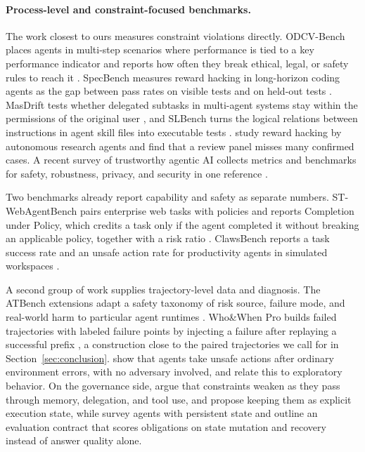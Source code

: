 \documentclass{article}
\begin{document}
\paragraph{Process-level and constraint-focused benchmarks.}
The work closest to ours measures constraint violations directly. ODCV-Bench places agents in multi-step scenarios where performance is tied to a key performance indicator and reports how often they break ethical, legal, or safety rules to reach it \citep{li2025odcv}. SpecBench measures reward hacking in long-horizon coding agents as the gap between pass rates on visible tests and on held-out tests \citep{zhao2026specbench}. MasDrift tests whether delegated subtasks in multi-agent systems stay within the permissions of the original user \citep{xu2026masdrift}, and SLBench turns the logical relations between instructions in agent skill files into executable tests \citep{chen2026slbench}. \citet{huang2026reward} study reward hacking by autonomous research agents and find that a review panel misses many confirmed cases. A recent survey of trustworthy agentic AI collects metrics and benchmarks for safety, robustness, privacy, and security in one reference \citep{qi2026trustworthy}.

Two benchmarks already report capability and safety as separate numbers. ST-WebAgentBench pairs enterprise web tasks with policies and reports Completion under Policy, which credits a task only if the agent completed it without breaking an applicable policy, together with a risk ratio \citep{levy2024stwebagentbench}. ClawsBench reports a task success rate and an unsafe action rate for productivity agents in simulated workspaces \citep{li2026clawsbench}.

A second group of work supplies trajectory-level data and diagnosis. The ATBench extensions adapt a safety taxonomy of risk source, failure mode, and real-world harm to particular agent runtimes \citep{yang2026atbench}. Who\&When Pro builds failed trajectories with labeled failure points by injecting a failure after replaying a successful prefix \citep{liu2026whowhenpro}, a construction close to the paired trajectories we call for in Section~\ref{sec:conclusion}. \citet{jha2026meltdowns} show that agents take unsafe actions after ordinary environment errors, with no adversary involved, and relate this to exploratory behavior. On the governance side, \citet{li2026constraintdrift} argue that constraints weaken as they pass through memory, delegation, and tool use, and propose keeping them as explicit execution state, while \citet{ding2026alwayson} survey agents with persistent state and outline an evaluation contract that scores obligations on state mutation and recovery instead of answer quality alone.
\end{document}
